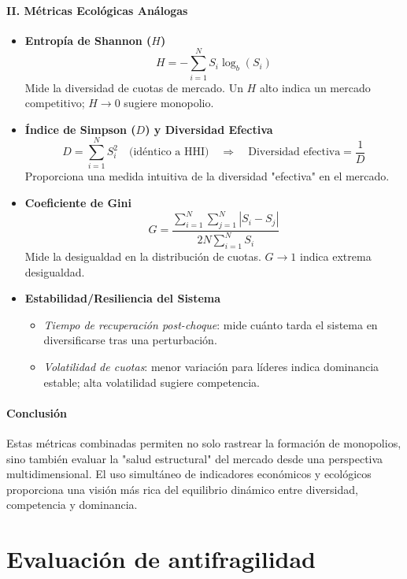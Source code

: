 \documentclass[a4paper,12pt]{article}
\begin{document}
\paragraph{II. Métricas Ecológicas Análogas}

\begin{itemize}
    \item \textbf{Entropía de Shannon ($H$)}
    \[
    H = -\sum_{i=1}^{N} S_i \log_b(S_i)
    \]
    Mide la diversidad de cuotas de mercado. Un $H$ alto indica un mercado competitivo; $H \rightarrow 0$ sugiere monopolio.

    \item \textbf{Índice de Simpson ($D$) y Diversidad Efectiva}
    \[
    D = \sum_{i=1}^{N} S_i^2 \quad \text{(idéntico a HHI)}
    \quad\Rightarrow\quad \text{Diversidad efectiva} = \frac{1}{D}
    \]
    Proporciona una medida intuitiva de la diversidad "efectiva" en el mercado.

    \item \textbf{Coeficiente de Gini}
    \[
    G = \frac{\sum_{i=1}^{N} \sum_{j=1}^{N} |S_i - S_j|}{2N \sum_{i=1}^{N} S_i}
    \]
    Mide la desigualdad en la distribución de cuotas. $G \rightarrow 1$ indica extrema desigualdad.

    \item \textbf{Estabilidad/Resiliencia del Sistema}
    \begin{itemize}
        \item \textit{Tiempo de recuperación post-choque}: mide cuánto tarda el sistema en diversificarse tras una perturbación.
        \item \textit{Volatilidad de cuotas}: menor variación para líderes indica dominancia estable; alta volatilidad sugiere competencia.
    \end{itemize}
\end{itemize}

\paragraph{Conclusión}

Estas métricas combinadas permiten no solo rastrear la formación de monopolios, sino también evaluar la "salud estructural" del mercado desde una perspectiva multidimensional. El uso simultáneo de indicadores económicos y ecológicos proporciona una visión más rica del equilibrio dinámico entre diversidad, competencia y dominancia.



\section*{Evaluación de antifragilidad}
\end{document}
